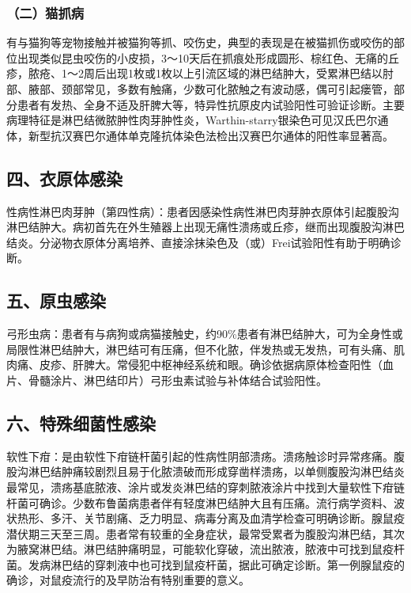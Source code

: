 \subsubsection{（二）猫抓病}

有与猫狗等宠物接触并被猫狗等抓、咬伤史，典型的表现是在被猫抓伤或咬伤的部位出现类似昆虫咬伤的小皮损，3～10天后在抓痕处形成圆形、棕红色、无痛的丘疹，脓疮、1～2周后出现1枚或1枚以上引流区域的淋巴结肿大，受累淋巴结以肘部、腋部、颈部常见，多数有触痛，少数可化脓触之有波动感，偶可引起瘘管，部分患者有发热、全身不适及肝脾大等，特异性抗原皮内试验阳性可验证诊断。主要病理特征是淋巴结微脓肿性肉芽肿性炎，Warthin-starry银染色可见汉氏巴尔通体，新型抗汉赛巴尔通体单克隆抗体染色法检出汉赛巴尔通体的阳性率显著高。

\subsection{四、衣原体感染}

性病性淋巴肉芽肿（第四性病）：患者因感染性病性淋巴肉芽肿衣原体引起腹股沟淋巴结肿大。病初首先在外生殖器上出现无痛性溃疡或丘疹，继而出现腹股沟淋巴结炎。分泌物衣原体分离培养、直接涂抹染色及（或）Frei试验阳性有助于明确诊断。

\subsection{五、原虫感染}

弓形虫病：患者有与病狗或病猫接触史，约90\%患者有淋巴结肿大，可为全身性或局限性淋巴结肿大，淋巴结可有压痛，但不化脓，伴发热或无发热，可有头痛、肌肉痛、皮疹、肝脾大。常侵犯中枢神经系统和眼。确诊依据病原体检查阳性（血片、骨髓涂片、淋巴结印片）弓形虫素试验与补体结合试验阳性。

\subsection{六、特殊细菌性感染}

软性下疳：是由软性下疳链杆菌引起的性病性阴部溃疡。溃疡触诊时异常疼痛。腹股沟淋巴结肿痛较剧烈且易于化脓溃破而形成穿凿样溃疡，以单侧腹股沟淋巴结炎最常见，溃疡基底脓液、涂片或发炎淋巴结的穿刺脓液涂片中找到大量软性下疳链杆菌可确诊。少数布鲁菌病患者伴有轻度淋巴结肿大且有压痛。流行病学资料、波状热形、多汗、关节剧痛、乏力明显、病毒分离及血清学检查可明确诊断。腺鼠疫潜伏期三天至三周。患者常有较重的全身症状，最常受累者为腹股沟淋巴结，其次为腋窝淋巴结。淋巴结肿痛明显，可能软化穿破，流出脓液，脓液中可找到鼠疫杆菌。发病淋巴结的穿刺液中也可找到鼠疫杆菌，据此可确定诊断。第一例腺鼠疫的确诊，对鼠疫流行的及早防治有特别重要的意义。

